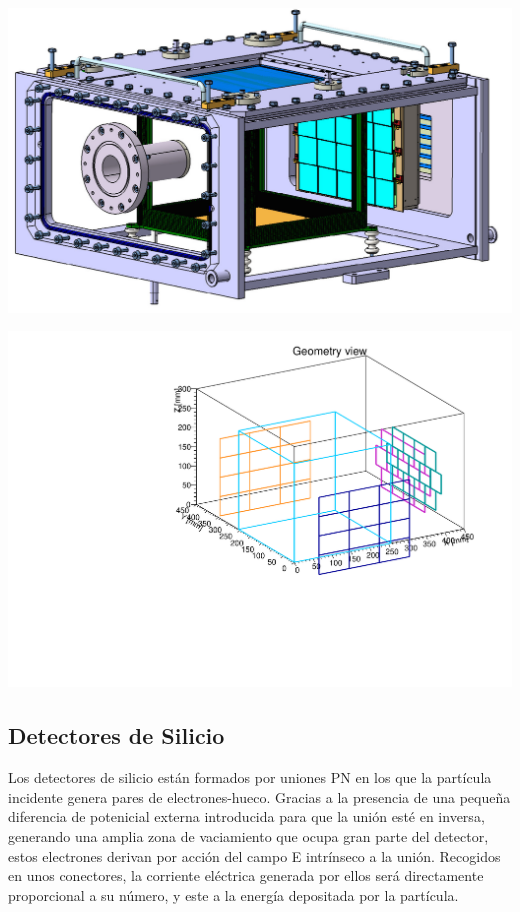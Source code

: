 \begin{minipage}{0.48\linewidth} \centering
	\includegraphics[width=1\linewidth]{Imagenes/ACTAR.png}
	\label{Fig:ACTAR}
\end{minipage}
\hfill
\begin{minipage}{0.458\linewidth} \centering
	\includegraphics[width=1\linewidth]{Imagenes/Actar.pdf}
	\label{Fig:Geo_Actar}
\end{minipage}


\subsection{Detectores de Silicio}

Los detectores de silicio están formados por uniones PN en los que la partícula incidente genera pares de electrones-hueco. Gracias a la presencia de una pequeña diferencia de potenicial externa introducida para que la unión esté en inversa, generando una amplia zona de vaciamiento que ocupa gran parte del detector, estos electrones derivan por acción del campo E intrínseco a la unión. Recogidos en unos conectores, la corriente eléctrica generada por ellos será directamente proporcional a su número, y este a la energía depositada por la partícula.



